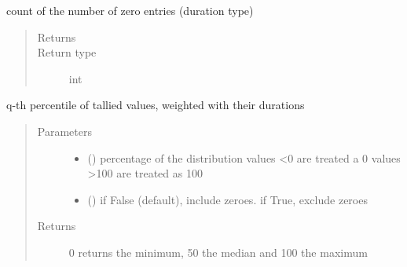 \documentclass[letterpaper,10pt,english]{sphinxmanual}
\begin{document}
\begin{fulllineitems}
\begin{fulllineitems}
\begin{quote}
\begin{description}
\end{description}\end{quote}

\end{fulllineitems}


\begin{fulllineitems}
\label{\detokenize{Reference:salabim.MonitorTimestamp.number_of_entries_zero}}
count of the number of zero entries (duration type)
\begin{quote}\begin{description}
\item[{Returns}] \leavevmode
{}

\item[{Return type}] \leavevmode
int

\end{description}\end{quote}

\end{fulllineitems}


\begin{fulllineitems}
\label{\detokenize{Reference:salabim.MonitorTimestamp.percentile}}
q-th percentile of tallied values, weighted with their durations
\begin{quote}\begin{description}
\item[{Parameters}] \leavevmode\begin{itemize}
\item {} 
 () \textendash{} percentage of the distribution 
values \textless{}0 are treated a 0 
values \textgreater{}100 are treated as 100

\item {} 
 () \textendash{} if False (default), include zeroes. if True, exclude zeroes

\end{itemize}

\item[{Returns}] \leavevmode
{} \textendash{} 0 returns the minimum, 50 the median and 100 the maximum


\end{description}
\end{quote}
\end{fulllineitems}
\end{fulllineitems}
\end{document}
